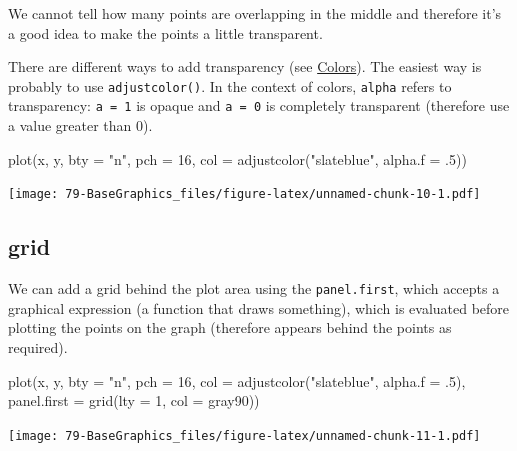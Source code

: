 \documentclass[
]{book}
\newenvironment{Shaded}{\begin{snugshade}}{\end{snugshade}}
\newcommand{\AttributeTok}[1]{\textcolor[rgb]{0.77,0.63,0.00}{#1}}
\newcommand{\DecValTok}[1]{\textcolor[rgb]{0.00,0.00,0.81}{#1}}
\newcommand{\FunctionTok}[1]{\textcolor[rgb]{0.00,0.00,0.00}{#1}}
\newcommand{\NormalTok}[1]{#1}
\newcommand{\StringTok}[1]{\textcolor[rgb]{0.31,0.60,0.02}{#1}}
\begin{document}
We cannot tell how many points are overlapping in the middle and therefore it's a good idea to make the points a little transparent.

There are different ways to add transparency (see \protect\hyperlink{colors}{Colors}). The easiest way is probably to use \texttt{adjustcolor()}. In the context of colors, \texttt{alpha} refers to transparency: \texttt{a\ =\ 1} is opaque and \texttt{a\ =\ 0} is completely transparent (therefore use a value greater than 0).

\begin{Shaded}
\begin{Highlighting}[]
\FunctionTok{plot}\NormalTok{(x, y,}
     \AttributeTok{bty =} \StringTok{"n"}\NormalTok{, }\AttributeTok{pch =} \DecValTok{16}\NormalTok{,}
     \AttributeTok{col =} \FunctionTok{adjustcolor}\NormalTok{(}\StringTok{"slateblue"}\NormalTok{, }\AttributeTok{alpha.f =}\NormalTok{ .}\DecValTok{5}\NormalTok{))}
\end{Highlighting}
\end{Shaded}

\texttt{[image: 79-BaseGraphics\_files/figure-latex/unnamed-chunk-10-1.pdf]}

\hypertarget{grid}{%
\subsection{grid}\label{grid}}

We can add a grid behind the plot area using the \texttt{panel.first}, which accepts a graphical expression (a function that draws something), which is evaluated before plotting the points on the graph (therefore appears behind the points as required).

\begin{Shaded}
\begin{Highlighting}[]
\FunctionTok{plot}\NormalTok{(x, y,}
     \AttributeTok{bty =} \StringTok{"n"}\NormalTok{, }\AttributeTok{pch =} \DecValTok{16}\NormalTok{,}
     \AttributeTok{col =} \FunctionTok{adjustcolor}\NormalTok{(}\StringTok{"slateblue"}\NormalTok{, }\AttributeTok{alpha.f =}\NormalTok{ .}\DecValTok{5}\NormalTok{),}
     \AttributeTok{panel.first =} \FunctionTok{grid}\NormalTok{(}\AttributeTok{lty =} \DecValTok{1}\NormalTok{, }\AttributeTok{col =} \StringTok{\textquotesingle{}gray90\textquotesingle{}}\NormalTok{))}
\end{Highlighting}
\end{Shaded}

\texttt{[image: 79-BaseGraphics\_files/figure-latex/unnamed-chunk-11-1.pdf]}
\end{document}
